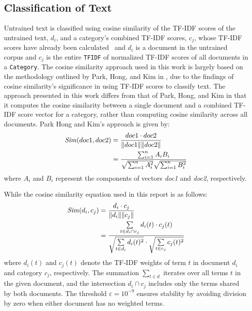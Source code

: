 \documentclass[conference]{IEEEtran}
\newcommand{\code}[1]{\lstinline[basicstyle=\ttfamily]|#1|}
\begin{document}
\subsection{Classification of Text}
Untrained text is classified using cosine similarity of the TF-IDF scores of the untrained text, $d_i$, and a category's combined TF-IDF scores, $c_j$, whose TF-IDF scores have already been calculated~\cite{b1} and $d_i$ is a document in the untrained corpus and $c_j$ is the entire \code{TFIDF} of normalized TF-IDF scores of all documents in a \code{Category}. The cosine similarity approach used in this work is largely based on the methodology outlined by Park, Hong, and Kim in \cite{b2}, due to the findings of cosine similarity's significance in using TF-IDF scores to classify text. The approach presented in this work differs from that of Park, Hong, and Kim in that it computes the cosine similarity between a single document and a combined TF-IDF score vector for a category, rather than computing cosine similarity across all documents. Park Hong and Kim's approach is given by\cite{b2}:
\begin{equation}
\begin{aligned}    
\text{\textit{Sim}}(doc1, doc2) &= \frac{doc1 \cdot doc2}{\|doc1\| \|doc2\|} \\
                       &= \frac{\sum_{i=1}^{n} A_i B_i}{\sqrt{\sum_{i=1}^{n} A_i^2} \sqrt{\sum_{i=1}^{n} B_i^2}}
\end{aligned}
\end{equation}
where $A_i$ and $B_i$ represent the components of vectors \textit{doc1} and \textit{doc2}, respectively.

While the cosine similarity equation used in this report is as follows: 
\begin{equation}
\begin{aligned}
\text{\textit{Sim}}(d_i, c_j) &= \frac{d_i \cdot c_j}{\|d_i\| \|c_j\|} \\
                     &= \frac{ \sum\limits_{t \in d_i \cap c_j} d_i(t) \cdot c_j(t) }
        { \sqrt{ \sum\limits_{t \in d_i} d_i(t)^2 } \cdot \sqrt{ \sum\limits_{t \in c_j} c_j(t)^2 } } \label{eq:cosine-sim} \\
\end{aligned}
\end{equation}
where $d_i(t)$ and $c_j(t)$ denote the TF-IDF weights of term $t$ in document $d_i$ and category $c_j$, respectively. The summation $\sum_{t \in d}$ iterates over all terms $t$ in the given document, and the intersection $d_i \cap c_j$ includes only the terms shared by both documents. The threshold $\varepsilon = 10^{-9}$ ensures stability by avoiding division by zero when either document has no weighted terms.
\end{document}
